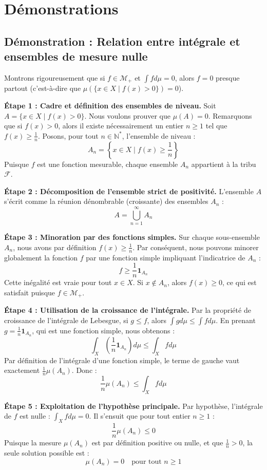 \documentclass[11pt,a4paper]{article}
\begin{document}
\section{D\'emonstrations}

\subsection*{D\'emonstration : Relation entre int\'egrale et ensembles de mesure nulle}

Montrons rigoureusement que si $f \in \mathcal{M}_+$ et $\int f d\mu = 0$, alors $f = 0$ presque partout (c'est-\`a-dire que $\mu(\{x \in X \mid f(x) > 0\}) = 0$).

\textbf{Étape 1 : Cadre et d\'efinition des ensembles de niveau.}
Soit $A = \{x \in X \mid f(x) > 0\}$. Nous voulons prouver que $\mu(A) = 0$.
Remarquons que si $f(x) > 0$, alors il existe n\'ecessairement un entier $n \ge 1$ tel que $f(x) \ge \frac{1}{n}$.
Posons, pour tout $n \in \mathbb{N}^*$, l'ensemble de niveau :
$$A_n = \left\{x \in X \mid f(x) \ge \frac{1}{n}\right\}$$
Puisque $f$ est une fonction mesurable, chaque ensemble $A_n$ appartient \`a la tribu $\mathcal{F}$.

\textbf{Étape 2 : D\'ecomposition de l'ensemble strict de positivit\'e.}
L'ensemble $A$ s'\'ecrit comme la r\'eunion d\'enombrable (croissante) des ensembles $A_n$ :
$$A = \bigcup_{n=1}^\infty A_n$$

\textbf{Étape 3 : Minoration par des fonctions simples.}
Sur chaque sous-ensemble $A_n$, nous avons par d\'efinition $f(x) \ge \frac{1}{n}$.
Par cons\'equent, nous pouvons minorer globalement la fonction $f$ par une fonction simple impliquant l'indicatrice de $A_n$ :
$$f \ge \frac{1}{n} \mathbf{1}_{A_n}$$
Cette in\'egalit\'e est vraie pour tout $x \in X$. Si $x \notin A_n$, alors $f(x) \ge 0$, ce qui est satisfait puisque $f \in \mathcal{M}_+$.

\textbf{Étape 4 : Utilisation de la croissance de l'int\'egrale.}
Par la propri\'et\'e de croissance de l'int\'egrale de Lebesgue, si $g \le f$, alors $\int g d\mu \le \int f d\mu$.
En prenant $g = \frac{1}{n} \mathbf{1}_{A_n}$, qui est une fonction simple, nous obtenons :
$$\int_X \left(\frac{1}{n} \mathbf{1}_{A_n}\right) d\mu \le \int_X f d\mu$$
Par d\'efinition de l'int\'egrale d'une fonction simple, le terme de gauche vaut exactement $\frac{1}{n} \mu(A_n)$.
Donc :
$$\frac{1}{n} \mu(A_n) \le \int_X f d\mu$$

\textbf{Étape 5 : Exploitation de l'hypoth\`ese principale.}
Par hypoth\`ese, l'int\'egrale de $f$ est nulle : $\int_X f d\mu = 0$.
Il s'ensuit que pour tout entier $n \ge 1$ :
$$\frac{1}{n} \mu(A_n) \le 0$$
Puisque la mesure $\mu(A_n)$ est par d\'efinition positive ou nulle, et que $\frac{1}{n} > 0$, la seule solution possible est :
$$\mu(A_n) = 0 \quad \text{pour tout } n \ge 1$$
\end{document}
